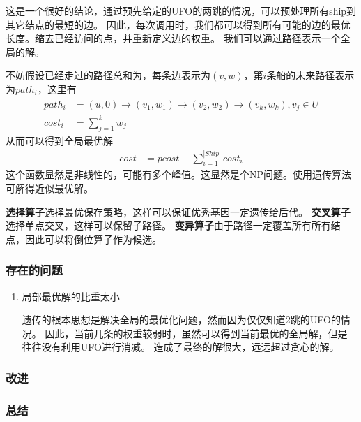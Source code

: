 \documentclass[hyperref,UTF8]{ctexart}
\theoremstyle{definition}
\theoremstyle{remark}
\numberwithin{equation}{subsection}
\newcommand{\Emph}{\textbf}
\begin{document}
	这是一个很好的结论，通过预先给定的UFO的两跳的情况，可以预处理所有ship到其它结点的最短的边。
	因此，每次调用时，我们都可以得到所有可能的边的最优长度。缩去已经访问的点，并重新定义边的权重。
	我们可以通过路径表示一个全局的解。
	
	不妨假设已经走过的路径总和为，每条边表示为$(v, w)$，第$i$条船的未来路径表示为$path_i$，这里有
	\begin{align}
		path_i &= (u, 0) \rightarrow (v_1, w_1) \rightarrow (v_2, w_2) \rightarrow (v_k, w_k), v_j \in \bar{U}	\\
		cost_i &= \sum_{j=1}^{k} w_j
	\end{align}
	从而可以得到全局最优解
	\begin{align}
		cost &= pcost + \sum_{i=1}^{|Ship|} cost_i
	\end{align}
	这个函数显然是非线性的，可能有多个峰值。这显然是个NP问题。使用遗传算法可解得近似最优解。
	
	\Emph{选择算子}选择最优保存策略，这样可以保证优秀基因一定遗传给后代。
	\Emph{交叉算子}选择单点交叉，这样可以保留子路径。
	\Emph{变异算子}由于路径一定覆盖所有所有结点，因此可以将倒位算子作为候选。
	
\subsubsection{存在的问题}

	\begin{enumerate}[(1)]
		
		\item 局部最优解的比重太小
		
		遗传的根本思想是解决全局的最优化问题，然而因为仅仅知道2跳的UFO的情况。
		因此，当前几条的权重较弱时，虽然可以得到当前最优的全局解，但是往往没有利用UFO进行消减。
		造成了最终的解很大，远远超过贪心的解。
		
	\end{enumerate}

\subsubsection{改进}

\subsubsection{总结}
	
\end{document}
